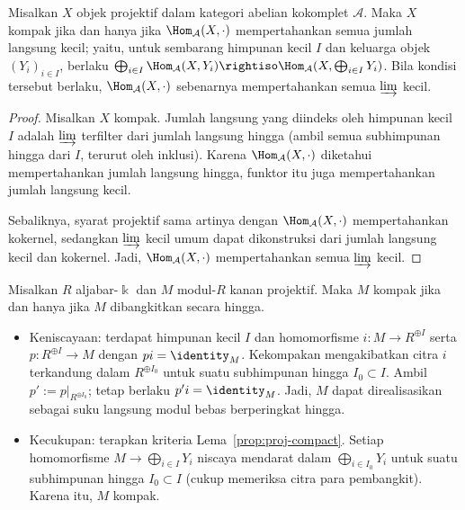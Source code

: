 \begin{lemma}\label{prop:proj-compact}
	Misalkan $X$ objek projektif dalam kategori abelian kokomplet $\mathcal{A}$.
	Maka $X$ kompak jika dan hanya jika
	$\Hom_{\mathcal{A}}(X,\mathord\cdot)$ mempertahankan semua jumlah langsung
	kecil; yaitu, untuk sembarang himpunan kecil $I$ dan keluarga objek
	$(Y_i)_{i\in I}$, berlaku
	$\bigoplus_{i\in I}\Hom_{\mathcal{A}}(X,Y_i)\rightiso
	\Hom_{\mathcal{A}}(X,\bigoplus_{i\in I}Y_i)$. Bila kondisi tersebut
	berlaku, $\Hom_{\mathcal{A}}(X,\mathord\cdot)$ sebenarnya mempertahankan
	semua $\varinjlim$ kecil.
\end{lemma}
\begin{proof}
	Misalkan $X$ kompak. Jumlah langsung yang diindeks oleh himpunan kecil $I$
	adalah $\varinjlim$ terfilter dari jumlah langsung hingga (ambil semua
	subhimpunan hingga dari $I$, terurut oleh inklusi). Karena
	$\Hom_{\mathcal{A}}(X,\mathord\cdot)$ diketahui mempertahankan jumlah
	langsung hingga, funktor itu juga mempertahankan jumlah langsung kecil.

	Sebaliknya, syarat projektif sama artinya dengan
	$\Hom_{\mathcal{A}}(X,\mathord\cdot)$ mempertahankan kokernel, sedangkan
	$\varinjlim$ kecil umum dapat dikonstruksi dari jumlah langsung kecil dan
	kokernel. Jadi, $\Hom_{\mathcal{A}}(X,\mathord\cdot)$ mempertahankan semua
	$\varinjlim$ kecil.
\end{proof}

\begin{example}
	Misalkan $R$ aljabar-$\Bbbk$ dan $M$ modul-$R$ kanan projektif. Maka $M$
	kompak jika dan hanya jika $M$ dibangkitkan secara hingga.
	\begin{itemize}
		\item Keniscayaan: terdapat himpunan kecil $I$ dan homomorfisme
		$i:M\to R^{\oplus I}$ serta $p:R^{\oplus I}\to M$ dengan
		$pi=\identity_M$. Kekompakan mengakibatkan citra $i$ terkandung dalam
		$R^{\oplus I_0}$ untuk suatu subhimpunan hingga $I_0\subset I$. Ambil
		$p':=p|_{R^{\oplus I_0}}$; tetap berlaku $p'i=\identity_M$. Jadi, $M$
		dapat direalisasikan sebagai suku langsung modul bebas berperingkat
		hingga.
		\item Kecukupan: terapkan kriteria Lema~\ref{prop:proj-compact}. Setiap
		homomorfisme $M\to\bigoplus_{i\in I}Y_i$ niscaya mendarat dalam
		$\bigoplus_{i\in I_0}Y_i$ untuk suatu subhimpunan hingga
		$I_0\subset I$ (cukup memeriksa citra para pembangkit). Karena itu, $M$
		kompak.
	\end{itemize}
\end{example}

